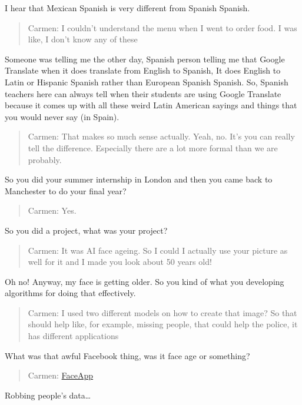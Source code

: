 \documentclass[
]{book}
\begin{document}
I hear that Mexican Spanish is very different from Spanish Spanish.

\begin{quote}
Carmen: I couldn't understand the menu when I went to order food. I was like, I don't know any of these
\end{quote}

Someone was telling me the other day, Spanish person telling me that Google Translate when it does translate from English to Spanish, It does English to Latin or Hispanic Spanish rather than European Spanish Spanish. So, Spanish teachers here can always tell when their students are using Google Translate because it comes up with all these weird Latin American sayings and things that you would never say (in Spain).

\begin{quote}
Carmen: That makes so much sense actually. Yeah, no. It's you can really tell the difference. Especially there are a lot more formal than we are probably.
\end{quote}

So you did your summer internship in London and then you came back to Manchester to do your final year?

\begin{quote}
Carmen: Yes.
\end{quote}

So you did a project, what was your project?

\begin{quote}
Carmen: It was AI face ageing. So I could I actually use your picture as well for it and I made you look about 50 years old!
\end{quote}

Oh no! Anyway, my face is getting older. So you kind of what you developing algorithms for doing that effectively.

\begin{quote}
Carmen: I used two different models on how to create that image? So that should help like, for example, missing people, that could help the police, it has different applications
\end{quote}

What was that awful Facebook thing, was it face age or something?

\begin{quote}
Carmen: \href{https://en.wikipedia.org/wiki/FaceApp}{FaceApp}
\end{quote}

Robbing people's data\ldots{}
\end{document}
